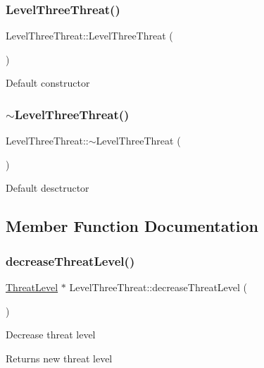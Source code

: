 \subsubsection{\texorpdfstring{Level\+Three\+Threat()}{LevelThreeThreat()}}
{\footnotesize\ttfamily Level\+Three\+Threat\+::\+Level\+Three\+Threat (\begin{DoxyParamCaption}{ }\end{DoxyParamCaption})}

Default constructor \mbox{\label{classLevelThreeThreat_ab5caa48c8913099e0a3520ce6849b295}} 
\subsubsection{\texorpdfstring{$\sim$\+Level\+Three\+Threat()}{~LevelThreeThreat()}}
{\footnotesize\ttfamily Level\+Three\+Threat\+::$\sim$\+Level\+Three\+Threat (\begin{DoxyParamCaption}{ }\end{DoxyParamCaption})}

Default desctructor 

\subsection{Member Function Documentation}
\mbox{\label{classLevelThreeThreat_a98337ab08fe61b136d9c9e48f7ace804}} 
\subsubsection{\texorpdfstring{decrease\+Threat\+Level()}{decreaseThreatLevel()}}
{\footnotesize\ttfamily \hyperlink{classThreatLevel}{Threat\+Level} $\ast$ Level\+Three\+Threat\+::decrease\+Threat\+Level (\begin{DoxyParamCaption}{ }\end{DoxyParamCaption})\hspace{0.3cm}{\ttfamily [virtual]}}

Decrease threat level \begin{DoxyReturn}{Returns}
new threat level 
\end{DoxyReturn}


